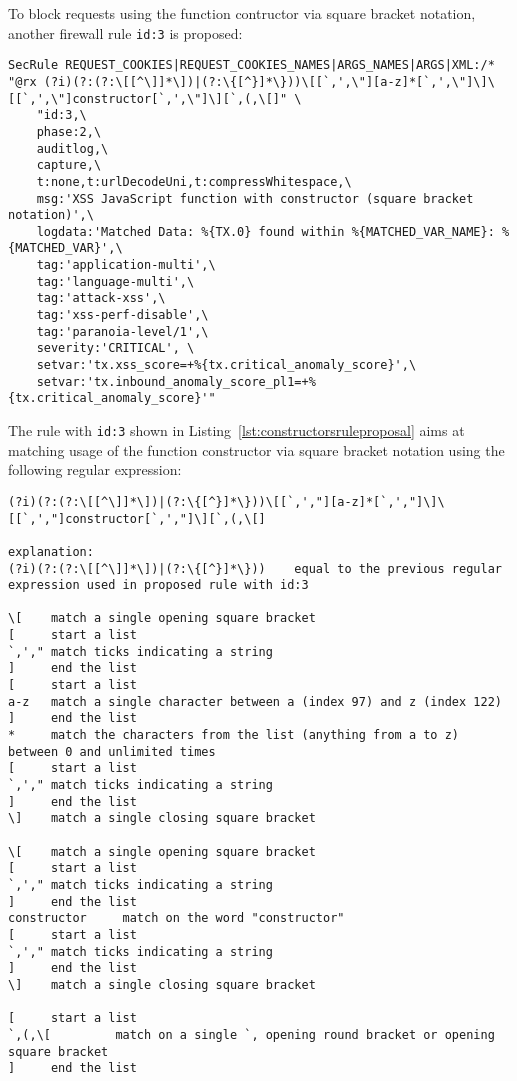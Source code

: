 To block requests using the function contructor via square bracket notation, another firewall rule \verb|id:3| is proposed:

\begin{lstlisting}[style=basicStyle, caption=rule proposal to block usage of function constructor via square bracket notation, label={lst:constructorsruleproposalB}]
SecRule REQUEST_COOKIES|REQUEST_COOKIES_NAMES|ARGS_NAMES|ARGS|XML:/* "@rx (?i)(?:(?:\[[^\]]*\])|(?:\{[^}]*\}))\[[`,',\"][a-z]*[`,',\"]\]\[[`,',\"]constructor[`,',\"]\][`,(,\[]" \
    "id:3,\
    phase:2,\
    auditlog,\
    capture,\
    t:none,t:urlDecodeUni,t:compressWhitespace,\
    msg:'XSS JavaScript function with constructor (square bracket notation)',\
    logdata:'Matched Data: %{TX.0} found within %{MATCHED_VAR_NAME}: %{MATCHED_VAR}',\
    tag:'application-multi',\
    tag:'language-multi',\
    tag:'attack-xss',\
    tag:'xss-perf-disable',\
    tag:'paranoia-level/1',\
    severity:'CRITICAL', \
    setvar:'tx.xss_score=+%{tx.critical_anomaly_score}',\
    setvar:'tx.inbound_anomaly_score_pl1=+%{tx.critical_anomaly_score}'"
\end{lstlisting}

The rule with \verb|id:3| shown in Listing~\ref{lst:constructorsruleproposal} aims at matching usage of the function constructor via square bracket notation using the following regular expression:

\begin{lstlisting}[style=basicStyle, caption=regex of proposed rule id:2, label={lst:constructorsruleproposalregexB}]
(?i)(?:(?:\[[^\]]*\])|(?:\{[^}]*\}))\[[`,',"][a-z]*[`,',"]\]\[[`,',"]constructor[`,',"]\][`,(,\[]

explanation:
(?i)(?:(?:\[[^\]]*\])|(?:\{[^}]*\}))    equal to the previous regular expression used in proposed rule with id:3

\[    match a single opening square bracket
[     start a list
`,'," match ticks indicating a string
]     end the list
[     start a list
a-z   match a single character between a (index 97) and z (index 122)
]     end the list
*     match the characters from the list (anything from a to z) between 0 and unlimited times
[     start a list
`,'," match ticks indicating a string
]     end the list
\]    match a single closing square bracket

\[    match a single opening square bracket
[     start a list
`,'," match ticks indicating a string
]     end the list
constructor     match on the word "constructor"
[     start a list
`,'," match ticks indicating a string
]     end the list
\]    match a single closing square bracket

[     start a list
`,(,\[         match on a single `, opening round bracket or opening square bracket
]     end the list
\end{lstlisting}

